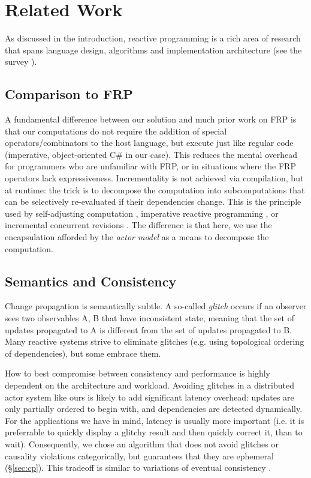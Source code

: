 \section{Related Work}

As discussed in the introduction, reactive programming is a rich area of research that spans language design, algorithms and implementation architecture (see the survey \cite{reactivesurvey}).

\subsection{Comparison to FRP}

A fundamental difference between our solution and much prior work on FRP \cite{frp-firstprinciples,frp-animation,frp-frtime,frp-arrows,elm,afp,flapjax,frappe} is that our computations do not require the addition of special operators/combinators to the host language, but execute just like regular code (imperative, object-oriented C\# in our case). This reduces the mental overhead for programmers who are unfamiliar with FRP, or in situations where the FRP operators lack expressiveness. Incrementality is not achieved via compilation, but at runtime: the trick is to decompose the computation into subcomputations that can be selectively re-evaluated if their dependencies change. This is the principle used by self-adjusting computation \cite{acar-ahmed-blume-POPL08,Acar:SelfAdjustingExperiments,Acar:SelfAdjustingOverview,Hammer:Ceal09,Acar:SelfAdjustingTypes10}, imperative reactive programming \cite{camil}, or incremental concurrent revisions \cite{burckhardt-leijen-yi-sadowski-ball-OOPSLA11}. The difference is that here, we use the encapsulation afforded by the \emph{actor model} as a means to decompose the computation.

\subsection{Semantics and Consistency}

Change propagation is semantically subtle. A so-called \emph{glitch} occurs if an observer sees two observables A, B that have inconsistent state, meaning that the set of updates propagated to A is different from the set of updates propagated to B. Many reactive systems strive to eliminate glitches (e.g. using topological ordering of dependencies), but some embrace them.

How to best compromise between consistency and performance is highly dependent on the architecture and workload. Avoiding glitches in a distributed actor system like ours is likely to add significant latency overhead: updates are only partially ordered to begin with, and dependencies are detected dynamically. For the applications we have in mind, latency is usually more important (i.e. it is preferrable to quickly display a glitchy result and then quickly correct it, than to wait). Consequently, we chose an algorithm that does not avoid glitches or causality violations categorically, but guarantees that they are ephemeral (\S\ref{sec:cp}). This tradeoff is similar to variations of eventual consistency \cite{principles}.
 
